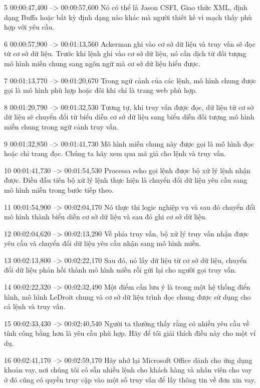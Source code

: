 5
00:00:47,400 --> 00:00:57,600
Nó có thể là Jason CSFI, Giao thức XML, định dạng Buffa hoặc bất kỳ định dạng nào khác mà người thiết kế vi mạch thấy phù hợp với yêu cầu.

6
00:00:57,900 --> 00:01:13,560
Ackerman ghi vào cơ sở dữ liệu và truy vấn sẽ đọc từ cơ sở dữ liệu.  Trước khi lệnh ghi vào cơ sở dữ liệu, nó cần dịch từ đối tượng mô hình miền chung sang ngôn ngữ mà cơ sở dữ liệu hiểu được.

7
00:01:13,770 --> 00:01:20,670
Trong ngữ cảnh của các lệnh, mô hình chung được gọi là mô hình phù hợp hoặc đôi khi chỉ là trang web phù hợp.

8
00:01:20,790 --> 00:01:32,530
Tương tự, khi truy vấn được đọc, dữ liệu từ cơ sở dữ liệu sẽ chuyển đổi từ biểu diễn cơ sở dữ liệu sang biểu diễn đối tượng mô hình miền chung trong ngữ cảnh truy vấn.

9
00:01:32,850 --> 00:01:41,730
Mô hình miền chung này được gọi là mô hình đọc hoặc chỉ trang đọc.  Chúng ta hãy xem qua mã giả cho lệnh và truy vấn.

10
00:01:41,730 --> 00:01:54,530
Processa echo gọi lệnh được bộ xử lý lệnh nhận được.  Điều đầu tiên bộ xử lý lệnh thực hiện là chuyển đổi dữ liệu yêu cầu sang mô hình miền trong bước tiếp theo.

11
00:01:54,900 --> 00:02:04,170
Nó thực thi logic nghiệp vụ và sau đó chuyển đổi mô hình thành biểu diễn cơ sở dữ liệu và sau đó ghi cơ sở dữ liệu.

12
00:02:04,620 --> 00:02:13,290
Về phía truy vấn, bộ xử lý truy vấn nhận được yêu cầu và chuyển đổi dữ liệu yêu cầu nhận sang mô hình miền.

13
00:02:13,800 --> 00:02:22,170
Sau đó, nó lấy dữ liệu từ cơ sở dữ liệu, chuyển đổi dữ liệu phản hồi thành mô hình miền rồi gửi lại cho người gọi truy vấn.

14
00:02:22,320 --> 00:02:32,490
Một điểm cần lưu ý là trong một hệ thống điển hình, mô hình LeDroit chung và cơ sở dữ liệu trình đọc chung được sử dụng cho cả lệnh và truy vấn.

15
00:02:33,430 --> 00:02:40,540
Người ta thường thấy rằng có nhiều yêu cầu về tính công bằng hơn là yêu cầu phù hợp.  Hãy để tôi giải thích điều này cho một ví dụ.

16
00:02:41,170 --> 00:02:59,170
Hãy nhớ lại Microsoft Office dành cho ứng dụng khoản vay, nơi chúng tôi có sẵn nhiều lệnh cho khách hàng và nhân viên cho vay ở đó cũng có quyền truy cập vào một số truy vấn để lấy thông tin về đơn xin vay.

